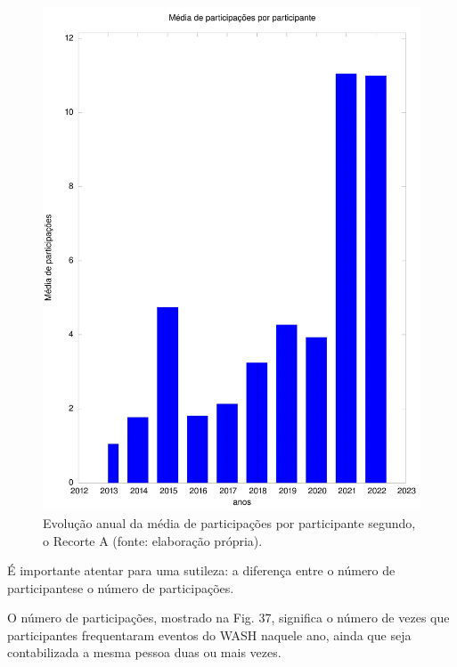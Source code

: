 \documentclass[
12pt,		%
openright,	%
twoside,  %
a4paper,			%
chapter=TITLE,		%
english,			%
french,				%
spanish,			%
brazil				%
]{USPSC-classe/USPSC}
\begin{document}
\begin{figure}[max size={\textwidth}{\textheight}]
\begin{minipage}[b]{0.4\linewidth}
                \includegraphics[width=1.0\linewidth]{../../imagens/output-media-participacoes.jpeg}
                \caption{Evolu\c{c}\~ao anual da m\'edia de participa\c{c}\~oes por participante segundo, o Recorte A (fonte: elabora\c{c}\~ao pr\'opria).}
                \label{a8f2d72073b88290f9b8731b144383d2f7c4dc4b}
\end{minipage}%
\hspace{0.5cm}
\end{figure}



\'E importante atentar para uma sutileza: a diferen\c{c}a entre o \textquotedbl  n\'umero de participantes\textquotedbl  e o \textquotedbl n\'umero de participa\c{c}\~oes\textquotedbl .









O n\'umero de participa\c{c}\~oes, mostrado na Fig. 37, significa o n\'umero de vezes que participantes frequentaram eventos do WASH naquele ano, ainda que seja contabilizada a mesma pessoa duas ou mais vezes.
\end{document}
